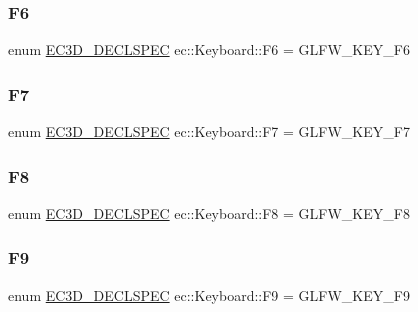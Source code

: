 \subsubsection{\texorpdfstring{F6}{F6}}
{\footnotesize\ttfamily enum \mbox{\hyperlink{_common_8h_aac42573e202ca3dd4d259c81691e2369}{E\+C3\+D\+\_\+\+D\+E\+C\+L\+S\+P\+EC}} ec\+::\+Keyboard\+::\+F6 = G\+L\+F\+W\+\_\+\+K\+E\+Y\+\_\+\+F6}

\mbox{\label{classec_1_1_keyboard_ad0da55a468002a1193b02ab3b342a267}} 
\subsubsection{\texorpdfstring{F7}{F7}}
{\footnotesize\ttfamily enum \mbox{\hyperlink{_common_8h_aac42573e202ca3dd4d259c81691e2369}{E\+C3\+D\+\_\+\+D\+E\+C\+L\+S\+P\+EC}} ec\+::\+Keyboard\+::\+F7 = G\+L\+F\+W\+\_\+\+K\+E\+Y\+\_\+\+F7}

\mbox{\label{classec_1_1_keyboard_a89d166f0527389eb2eaec46dc1f86c79}} 
\subsubsection{\texorpdfstring{F8}{F8}}
{\footnotesize\ttfamily enum \mbox{\hyperlink{_common_8h_aac42573e202ca3dd4d259c81691e2369}{E\+C3\+D\+\_\+\+D\+E\+C\+L\+S\+P\+EC}} ec\+::\+Keyboard\+::\+F8 = G\+L\+F\+W\+\_\+\+K\+E\+Y\+\_\+\+F8}

\mbox{\label{classec_1_1_keyboard_a3dbe3f47995a8defdc3c142bc0983a4c}} 
\subsubsection{\texorpdfstring{F9}{F9}}
{\footnotesize\ttfamily enum \mbox{\hyperlink{_common_8h_aac42573e202ca3dd4d259c81691e2369}{E\+C3\+D\+\_\+\+D\+E\+C\+L\+S\+P\+EC}} ec\+::\+Keyboard\+::\+F9 = G\+L\+F\+W\+\_\+\+K\+E\+Y\+\_\+\+F9}

\mbox{\label{classec_1_1_keyboard_a7956c29b83bc5d7bf3b1f5f4b806fb50}} 
